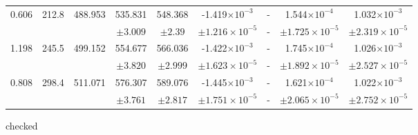 \documentclass[10pt,a4paper]{article}
\begin{document}
\begin{table}[h!]
\begin{tabular}{ccccccccc}
							\hline 0.606 & 212.8 & 488.953 & 535.831 & 548.368 & -1.419$\times10^{-3}$ & - & 1.544$\times10^{-4}$ & 1.032$\times10^{-3}$ \\
							&&& $\pm3.009$ & $\pm2.39$ & $\pm1.216\times10^{-5}$ & - & $\pm1.725\times10^{-5}$ & $\pm2.319\times10^{-5}$  \\
							\hline 1.198 & 245.5 & 499.152 & 554.677 & 566.036 & -1.422$\times10^{-3}$ & - & 1.745$\times10^{-4}$ & 1.026$\times10^{-3}$ \\
							&&& $\pm3.820$ & $\pm2.999$ & $\pm1.623\times10^{-5}$ & - & $\pm1.892\times10^{-5}$ & $\pm2.527\times10^{-5}$  \\
							\hline 0.808 & 298.4 & 511.071 & 576.307 & 589.076 & -1.445$\times10^{-3}$ & - & 1.621$\times10^{-4}$  & 1.022$\times10^{-3}$ \\
							&&& $\pm3.761 $& $\pm2.817$ & $\pm1.751\times10^{-5}$ & - & $\pm2.065\times10^{-5}$ & $\pm2.752\times10^{-5}$  \\
							\hline
						\end{tabular}
					\end{table}
					{\color{red} checked}
\end{document}
